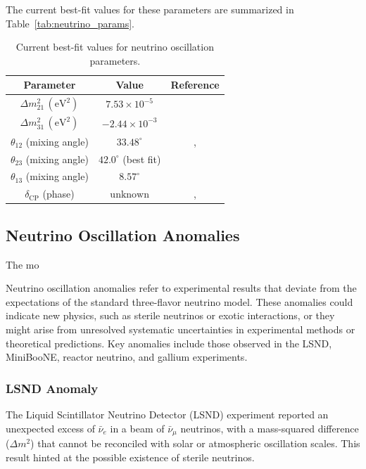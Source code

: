 \documentclass[a4paper,12pt,numbered]{article}
\begin{document}
The current best-fit values for these parameters are summarized in Table~\ref{tab:neutrino_params}.

\begin{table}[h!]
\centering
\begin{tabular}{|c|c|c|}
\hline
\textbf{Parameter} & \textbf{Value} & \textbf{Reference} \\
\hline
\(\Delta m^2_{21} \, (\text{eV}^2)\) & \(7.53 \times 10^{-5}\) & \cite{Fogli_2012} \\
\(\Delta m^2_{31} \, (\text{eV}^2)\) & \(-2.44 \times 10^{-3}\) & \cite{Fogli_2012} \\
\(\theta_{12}\) (mixing angle) & \(33.48^\circ\) & \cite{Fogli_2012}, \cite{Fukuda_2002} \\
\(\theta_{23}\) (mixing angle) & \(42.0^\circ\) (best fit) & \cite{T2K_2023} \\
\(\theta_{13}\) (mixing angle) & \(8.57^\circ\) & \cite{T2K_2023} \\
\(\delta_{\text{CP}}\) (phase) & \( \text{unknown} \) & \cite{Fogli_2012}, \cite{T2K_2023} \\
\hline
\end{tabular}
\caption{Current best-fit values for neutrino oscillation parameters.}
\end{table}

\subsection{Neutrino Oscillation Anomalies}

The mo

Neutrino oscillation anomalies refer to experimental results that deviate from the expectations of the standard three-flavor neutrino model. These anomalies could indicate new physics, such as sterile neutrinos or exotic interactions, or they might arise from unresolved systematic uncertainties in experimental methods or theoretical predictions. Key anomalies include those observed in the LSND, MiniBooNE, reactor neutrino, and gallium experiments.

\subsubsection{LSND Anomaly}  
The Liquid Scintillator Neutrino Detector (LSND) experiment reported an unexpected excess of $\bar{\nu}_e$ in a beam of $\bar{\nu}_\mu$ neutrinos, with a mass-squared difference ($\Delta m^2$) that cannot be reconciled with solar or atmospheric oscillation scales. This result hinted at the possible existence of sterile neutrinos.
\end{document}
